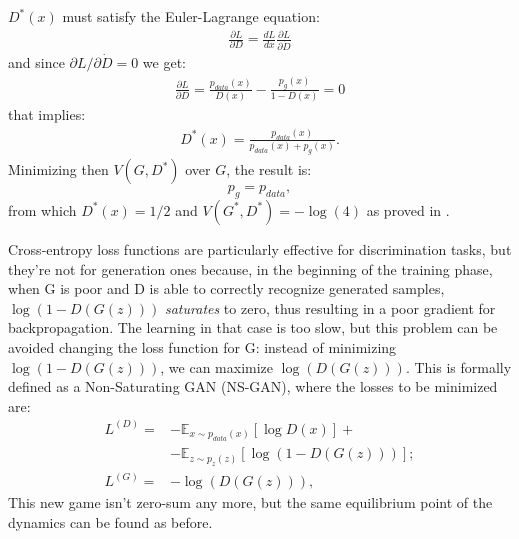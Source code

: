 $D^*(x)$ must satisfy the Euler-Lagrange equation:
\begin{align*}
	\frac{\partial L}{\partial D} = \frac{d L}{d x} \frac{\partial L}{\partial \dot{D}}
\end{align*}
and since $\partial L / \partial \dot{D} = 0$ we get:
\begin{align*}
	\frac{\partial L}{\partial D} = \frac{p_{data}(x)}{D(x)} - \frac{p_g(x)}{1-D(x)} = 0
\end{align*}
that implies:
\begin{align*}
	D^*(x) = \frac{p_{data}(x)}{p_{data}(x) + p_g(x)}.
\end{align*}
Minimizing then $V(G,D^*)$ over $G$, the result is:
\begin{equation*}
	p_g = p_{data},
\end{equation*}
from which $D^*(x)=1/2$ and $V(G^*,D^*)=-\log(4)$ as proved in \cite{NIPS2014_5423}.

Cross-entropy loss functions are particularly effective for discrimination tasks, but they're not for generation ones because, in the beginning of the training phase, when G is poor and D is able to correctly recognize generated samples, $\log(1-D(G(z)))$ \textit{saturates} to zero, thus resulting in a poor gradient for backpropagation. The learning in that case is too slow, but this problem can be avoided changing the loss function for G: instead of minimizing $\log(1-D(G(z)))$, we can maximize $\log(D(G(z)))$. This is formally defined as a Non-Saturating GAN (NS-GAN), where the losses to be minimized are:
\begin{equation*}
	\begin{split}
		L^{(D)} = &-\mathbb{E}_{x \sim p_{data}(x)}[\log D(x)]+\\
			      &- \mathbb{E}_{z \sim p_{z}(z)}[\log (1-D(G(z)))];\\
		L^{(G)} = &- \log(D(G(z))),
	\end{split}
\end{equation*}
This new game isn't zero-sum any more, but the same equilibrium point of the dynamics can be found as before. 

